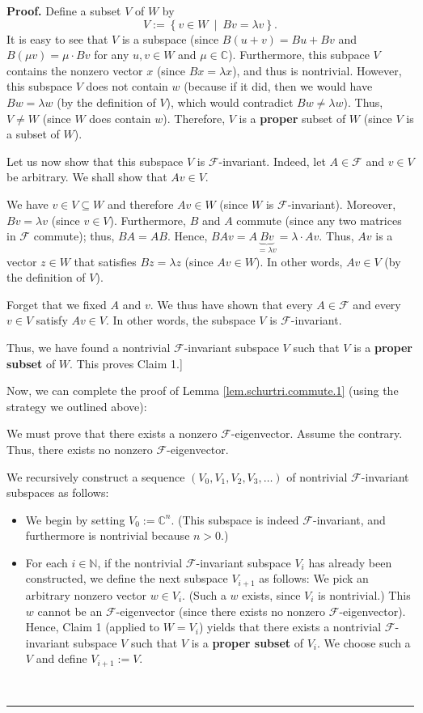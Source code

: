 \documentclass[numbers=enddot,12pt,final,onecolumn,notitlepage]{scrartcl}%
\numberwithin{exer}{subsection}
\theoremstyle{definition}
\newenvironment{proof}[1][Proof]{\noindent\textbf{#1.} }{\ \rule{0.5em}{0.5em}}
\begin{document}
\begin{proof}
Define a subset $V$ of $W$ by
\[
V:=\left\{  v\in W\ \mid\ Bv=\lambda v\right\}  .
\]
It is easy to see that $V$ is a subspace (since $B\left(  u+v\right)  =Bu+Bv$
and $B\left(  \mu v\right)  =\mu\cdot Bv$ for any $u,v\in W$ and $\mu
\in\mathbb{C}$). Furthermore, this subpace $V$ contains the nonzero vector $x$
(since $Bx=\lambda x$), and thus is nontrivial. However, this subspace $V$
does not contain $w$ (because if it did, then we would have $Bw=\lambda w$ (by
the definition of $V$), which would contradict $Bw\neq\lambda w$). Thus,
$V\neq W$ (since $W$ does contain $w$). Therefore, $V$ is a \textbf{proper}
subset of $W$ (since $V$ is a subset of $W$).

Let us now show that this subspace $V$ is $\mathcal{F}$-invariant. Indeed, let
$A\in\mathcal{F}$ and $v\in V$ be arbitrary. We shall show that $Av\in V$.

We have $v\in V\subseteq W$ and therefore $Av\in W$ (since $W$ is
$\mathcal{F}$-invariant). Moreover, $Bv=\lambda v$ (since $v\in V$).
Furthermore, $B$ and $A$ commute (since any two matrices in $\mathcal{F}$
commute); thus, $BA=AB$. Hence, $BAv=A\underbrace{Bv}_{=\lambda v}%
=\lambda\cdot Av$. Thus, $Av$ is a vector $z\in W$ that satisfies $Bz=\lambda
z$ (since $Av\in W$). In other words, $Av\in V$ (by the definition of $V$).

Forget that we fixed $A$ and $v$. We thus have shown that every $A\in
\mathcal{F}$ and every $v\in V$ satisfy $Av\in V$. In other words, the
subspace $V$ is $\mathcal{F}$-invariant.

Thus, we have found a nontrivial $\mathcal{F}$-invariant subspace $V$ such
that $V$ is a \textbf{proper subset} of $W$. This proves Claim 1.] \medskip

Now, we can complete the proof of Lemma \ref{lem.schurtri.commute.1} (using
the strategy we outlined above):

We must prove that there exists a nonzero $\mathcal{F}$-eigenvector. Assume
the contrary. Thus, there exists no nonzero $\mathcal{F}$-eigenvector.

We recursively construct a sequence $\left(  V_{0},V_{1},V_{2},V_{3}%
,\ldots\right)  $ of nontrivial $\mathcal{F}$-invariant subspaces as follows:

\begin{itemize}
\item We begin by setting $V_{0}:=\mathbb{C}^{n}$. (This subspace is indeed
$\mathcal{F}$-invariant, and furthermore is nontrivial because $n>0$.)

\item For each $i\in\mathbb{N}$, if the nontrivial $\mathcal{F}$-invariant
subspace $V_{i}$ has already been constructed, we define the next subspace
$V_{i+1}$ as follows: We pick an arbitrary nonzero vector $w\in V_{i}$. (Such
a $w$ exists, since $V_{i}$ is nontrivial.) This $w$ cannot be an
$\mathcal{F}$-eigenvector (since there exists no nonzero $\mathcal{F}%
$-eigenvector). Hence, Claim 1 (applied to $W=V_{i}$) yields that there exists
a nontrivial $\mathcal{F}$-invariant subspace $V$ such that $V$ is a
\textbf{proper subset} of $V_{i}$. We choose such a $V$ and define
$V_{i+1}:=V$.
\end{itemize}


\end{proof}
\end{document}
